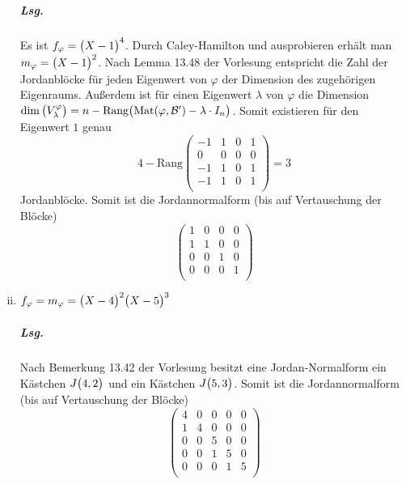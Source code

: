 \documentclass{scrreprt}
\newcommand\Mat{\text{Mat}}
\newcommand\Rang{\text{Rang}}
\begin{document}
\begin{enumerate}[(i)]
  \subparagraph{Lsg.} Es ist $f_{\varphi} = \qty\big(X - 1)^4$.
  Durch Caley-Hamilton und ausprobieren erhält man
  $m_{\varphi} = \qty\big(X - 1)^2$.
  Nach Lemma 13.48 der Vorlesung entspricht die Zahl der Jordanblöcke für jeden
  Eigenwert von $\varphi$ der Dimension des zugehörigen Eigenraums.
  Außerdem ist für einen Eigenwert $\lambda$ von $\varphi$ die Dimension
  $\dim\qty\big(V_{\lambda}^{\varphi}) =
  n - \Rang\qty\big(\Mat(\varphi, \mathcal{B}') - \lambda \cdot I_n)$.
  Somit existieren für den Eigenwert $1$ genau
  \[
    4 - \Rang\begin{pmatrix}
      -1 & 1 & 0 & 1 \\
       0 & 0 & 0 & 0 \\
      -1 & 1 & 0 & 1 \\
      -1 & 1 & 0 & 1 \\
    \end{pmatrix} = 3
  \]
  Jordanblöcke.
  Somit ist die Jordannormalform (bis auf Vertauschung der Blöcke)
  \[
    \begin{pmatrix}
      1 & 0 & 0 & 0 \\
      1 & 1 & 0 & 0 \\
      0 & 0 & 1 & 0 \\
      0 & 0 & 0 & 1 \\
    \end{pmatrix}
  \]

\newpage
\item $f_{\varphi} = m_{\varphi} = \qty\big(X - 4)^2\qty\big(X - 5)^3$

  \subparagraph{Lsg.} Nach Bemerkung 13.42 der Vorlesung besitzt eine
  Jordan-Normalform ein Kästchen $J\qty\big(4, 2)$ und ein Kästchen
  $J\qty\big(5, 3)$.
  Somit ist die Jordannormalform (bis auf Vertauschung der Blöcke)
  \[
    \begin{pmatrix}
      4 & 0 & 0 & 0 & 0 \\
      1 & 4 & 0 & 0 & 0 \\
      0 & 0 & 5 & 0 & 0 \\
      0 & 0 & 1 & 5 & 0 \\
      0 & 0 & 0 & 1 & 5 \\
    \end{pmatrix}
  \]
\end{enumerate}
\end{document}
